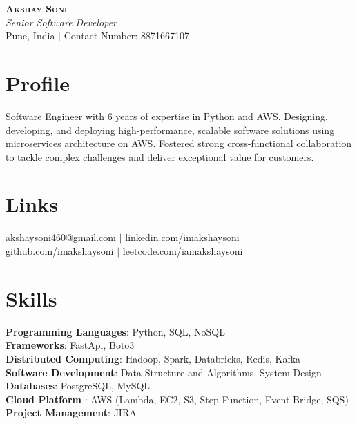\documentclass[letterpaper,11pt]{article}
\begin{document}

\begin{center}
    \textbf{\Huge \scshape  Akshay Soni} \\ \vspace{1pt}
    \small \textit{Senior Software Developer } \\
    Pune, India $|$ {Contact Number: 8871667107}
\end{center}

\section*{Profile}
Software Engineer with 6 years of expertise in Python and AWS. Designing, developing, and deploying high-performance, scalable software solutions using microservices architecture on AWS. Fostered strong cross-functional collaboration to tackle complex challenges and deliver exceptional value for customers.

\section{Links}
 \small { \href{mailto:akshaysoni460@gmail.com}{\underline{akshaysoni460@gmail.com}} $|$
  \href{https://www.linkedin.com/in/imakshaysoni}{\underline{linkedin.com/imakshaysoni}} $|$
    \href{https://github.com/imakshaysoni}{\underline{github.com/imakshaysoni}} $|$
     \href{https://leetcode.com/iamakshaysoni}{\underline{leetcode.com/iamakshaysoni}}
    }

\section{Skills}
 \begin{itemize}[leftmargin=0.15in, label={}]
    \small{\item{
     \textbf{Programming Languages}{: Python, SQL, NoSQL} \\
     \textbf{Frameworks}{: FastApi, Boto3} \\
\textbf{Distributed Computing}{: Hadoop, Spark, Databricks, Redis, Kafka} \\
     \textbf{Software Development}{: Data Structure and Algorithms, System Design} \\  \textbf{Databases}{: PostgreSQL, MySQL} \\\textbf{Cloud Platform }{: AWS (Lambda, EC2, S3, Step Function, Event Bridge, SQS) }\\
     \textbf{Project Management}{: JIRA}
    }}
 \end{itemize}
\end{document}
